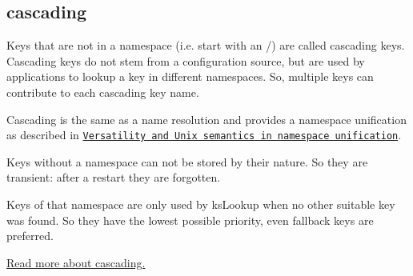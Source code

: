 \subsection*{cascading}

Keys that are not in a namespace (i.\+e. start with an {\ttfamily /}) are called cascading keys. Cascading keys do not stem from a configuration source, but are used by applications to lookup a key in different namespaces. So, multiple keys can contribute to each cascading key name.

Cascading is the same as a name resolution and provides a namespace unification as described in \href{http://dl.acm.org/citation.cfm?id=1138045}{\tt Versatility and Unix semantics in namespace unification}.

Keys without a namespace can not be stored by their nature. So they are transient\+: after a restart they are forgotten.

Keys of that namespace are only used by ks\+Lookup when no other suitable key was found. So they have the lowest possible priority, even fallback keys are preferred.

\hyperlink{doc_help_elektra-cascading_md}{Read more about cascading.} 